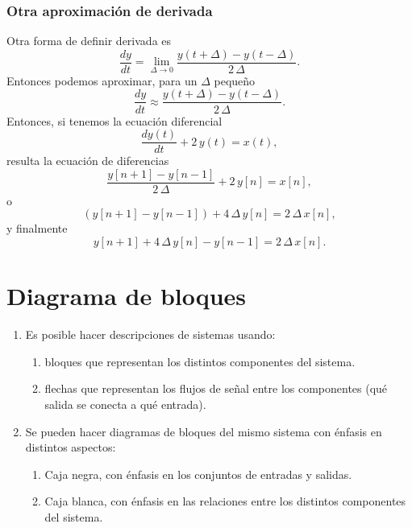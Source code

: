 \documentclass[11pt,a4paper,openany]{book}
\begin{document}
\subsubsection{Otra aproximación de derivada}
Otra forma de definir derivada es
\begin{equation}
	\frac{dy}{dt} = \lim_{\Delta \rightarrow 0} \frac{y(t+\Delta) - y(t-\Delta)}{2 \, \Delta}.
\end{equation}
Entonces podemos aproximar, para un $\Delta$ pequeño
\begin{equation}
	\frac{dy}{dt} \approx \frac{y(t+\Delta) - y(t-\Delta)}{2 \, \Delta}.
\end{equation}
Entonces, si tenemos la ecuación diferencial
\begin{equation}
	\frac{dy(t)}{dt} + 2 \, y(t) = x(t),
\end{equation}
resulta la ecuación de diferencias
\begin{equation}
	\frac{y[n+1] - y[n-1]}{2 \, \Delta} + 2 \, y[n] = x[n],
\end{equation}
o
\begin{equation}
	(y[n+1] - y[n-1]) + 4 \, \Delta \, y[n] = 2 \, \Delta \, x[n],
\end{equation}
y finalmente
\begin{equation}
	y[n+1] + 4 \, \Delta \, y[n] - y[n-1] = 2 \, \Delta \, x[n].
\end{equation}

\section{Diagrama de bloques}

\begin{enumerate}
	\item Es posible hacer descripciones de sistemas usando:
	\begin{enumerate}
		\item bloques que representan los distintos componentes del sistema.
		\item flechas que representan los flujos de señal entre los componentes (qué salida se conecta a qué entrada).
	\end{enumerate}
	
	\item Se pueden hacer diagramas de bloques del mismo sistema con énfasis en distintos aspectos:
	\begin{enumerate}
		\item Caja negra, con énfasis en los conjuntos de entradas y salidas.
		\item Caja blanca, con énfasis en las relaciones entre los distintos componentes del sistema.
	\end{enumerate}
	
\end{enumerate}
\end{document}
